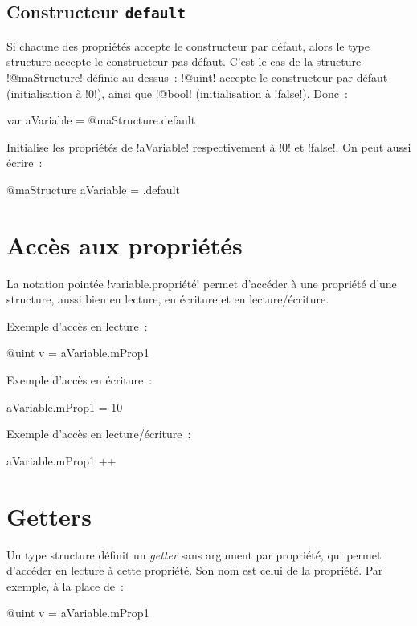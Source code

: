 \subsection{Constructeur \texttt{default}}

Si chacune des propriétés accepte le constructeur par défaut, alors le type structure accepte le constructeur pas défaut. C'est le cas de la structure \ggs!@maStructure! définie au dessus~: \ggs!@uint! accepte le constructeur par défaut (initialisation à \ggs!0!), ainsi que \ggs!@bool! (initialisation à \ggs!false!). Donc~:
\begin{galgas}
var aVariable = @maStructure.default
\end{galgas}
Initialise les propriétés de \ggs!aVariable! respectivement à \ggs!0! et \ggs!false!. On peut aussi écrire~:
\begin{galgas}
@maStructure aVariable = .default
\end{galgas}


\section{Accès aux propriétés}

La notation pointée \ggs!variable.propriété! permet d'accéder à une propriété d'une structure, aussi bien en lecture, en écriture et en lecture/écriture.

Exemple d'accès en lecture~:
\begin{galgas}
@uint v = aVariable.mProp1
\end{galgas}

Exemple d'accès en écriture~:
\begin{galgas}
aVariable.mProp1 = 10
\end{galgas}


Exemple d'accès en lecture/écriture~:
\begin{galgas}
aVariable.mProp1 ++
\end{galgas}





\section{Getters}

Un type structure définit un \emph{getter} sans argument par propriété, qui permet d'accéder en lecture à cette propriété. Son nom est celui de la propriété. Par exemple, à la place de~:
\begin{galgas}
@uint v = aVariable.mProp1
\end{galgas}

